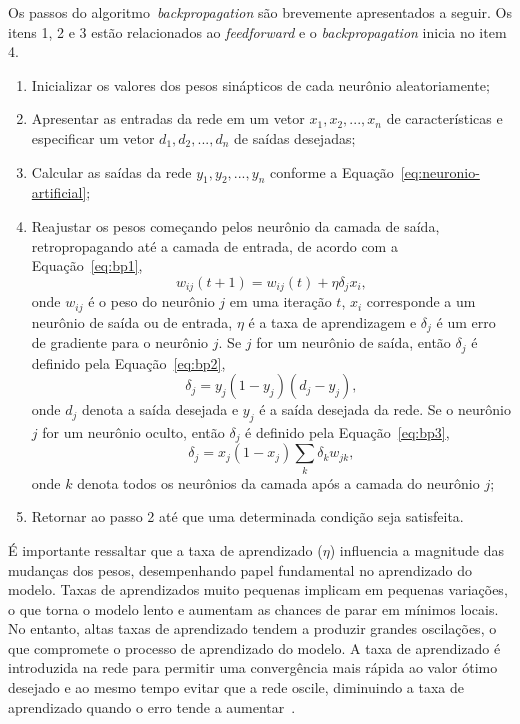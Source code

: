 Os passos do algoritmo~\textit{backpropagation} são brevemente apresentados a seguir. Os itens 1, 2 e 3 estão relacionados ao \textit{feedforward} e o \textit{backpropagation} inicia no item 4.

\begin{enumerate}
	\item Inicializar os valores dos pesos sinápticos de cada neurônio aleatoriamente;
	
	\item Apresentar as entradas da rede em um vetor ${x_1 , x_2 , ..., x_n}$ de características e especificar um vetor ${d_1 , d_2 , ..., d_n}$ de saídas desejadas;
	
	\item Calcular as saídas da rede ${y_1 , y_2 , ..., y_n}$ conforme a Equação~\ref{eq:neuronio-artificial};
	
	\item Reajustar os pesos começando pelos neurônio da camada de saída, retropropagando até a camada de entrada, de acordo com a Equação~\ref{eq:bp1},
    \begin{equation} \label{eq:bp1}
    	w_{ij} (t + 1)= w_{ij} (t) + \eta \delta_j x_i,
    \end{equation}
	onde $w_{ij}$ é o peso do neurônio $j$ em uma iteração $t$, $x_i$ corresponde a um neurônio de saída ou de entrada, $\eta$ é a taxa de aprendizagem e $\delta_j$ é um erro de gradiente para o neurônio $j$. Se $j$ for um neurônio de saída, então $\delta_j$ é definido pela Equação~\ref{eq:bp2},
	\begin{equation}
	\label{eq:bp2}
    	\delta_j = y_j (1 - y_j)(d_j - y_j),
    \end{equation}
	onde $d_j$ denota a saída desejada e $y_j$ é a saída desejada da rede. Se o neurônio $j$ for um neurônio oculto, então $\delta_j$ é definido pela Equação~\ref{eq:bp3},
	\begin{equation}
	\label{eq:bp3}
        \delta_j = x_j (1 - x_j) \sum_{k}\delta_k w_{jk},
    \end{equation}
	onde $k$ denota todos os neurônios da camada após a camada do neurônio $j$;
	\item Retornar ao passo 2 até que uma determinada condição seja satisfeita.
\end{enumerate}

É importante ressaltar que a taxa de aprendizado ($\eta$) influencia a magnitude das mudanças dos pesos, desempenhando papel fundamental no aprendizado do modelo. Taxas de aprendizados muito pequenas implicam em pequenas variações, o que torna o modelo lento e aumentam as chances de parar em mínimos locais. No entanto, altas taxas de aprendizado tendem a produzir grandes oscilações, o que compromete o processo de aprendizado do modelo. A taxa de aprendizado é introduzida na rede para permitir uma convergência mais rápida ao valor ótimo desejado e ao mesmo tempo evitar que a rede oscile, diminuindo a taxa de aprendizado quando o erro tende a aumentar~\cite{silva2004algoritmos,haykin2007redes,silva2010redes}.

